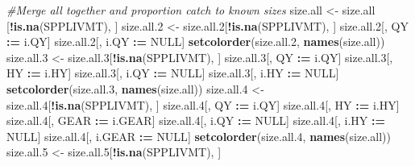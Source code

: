 \documentclass[]{article}
\newenvironment{Shaded}{\begin{snugshade}}{\end{snugshade}}
\newcommand{\KeywordTok}[1]{\textcolor[rgb]{0.13,0.29,0.53}{\textbf{#1}}}
\newcommand{\DecValTok}[1]{\textcolor[rgb]{0.00,0.00,0.81}{#1}}
\newcommand{\StringTok}[1]{\textcolor[rgb]{0.31,0.60,0.02}{#1}}
\newcommand{\CommentTok}[1]{\textcolor[rgb]{0.56,0.35,0.01}{\textit{#1}}}
\newcommand{\OtherTok}[1]{\textcolor[rgb]{0.56,0.35,0.01}{#1}}
\newcommand{\OperatorTok}[1]{\textcolor[rgb]{0.81,0.36,0.00}{\textbf{#1}}}
\newcommand{\ErrorTok}[1]{\textcolor[rgb]{0.64,0.00,0.00}{\textbf{#1}}}
\newcommand{\NormalTok}[1]{#1}
\begin{document}
\begin{Shaded}
\begin{Highlighting}[]
  \CommentTok{#Merge all together and proportion catch to known sizes}
\NormalTok{  size.all   <-}\StringTok{ }\NormalTok{size.all  [}\OperatorTok{!}\KeywordTok{is.na}\NormalTok{(SPPLIVMT), ]}
\NormalTok{  size.all.}\DecValTok{2}\NormalTok{ <-}\StringTok{ }\NormalTok{size.all.}\DecValTok{2}\NormalTok{[}\OperatorTok{!}\KeywordTok{is.na}\NormalTok{(SPPLIVMT), ]}
\NormalTok{  size.all.}\DecValTok{2}\NormalTok{[, QY   }\OperatorTok{:}\ErrorTok{=}\StringTok{ }\NormalTok{i.QY]}
\NormalTok{  size.all.}\DecValTok{2}\NormalTok{[, i.QY }\OperatorTok{:}\ErrorTok{=}\StringTok{ }\OtherTok{NULL}\NormalTok{]}
  \KeywordTok{setcolorder}\NormalTok{(size.all.}\DecValTok{2}\NormalTok{, }\KeywordTok{names}\NormalTok{(size.all))}
\NormalTok{  size.all.}\DecValTok{3}\NormalTok{ <-}\StringTok{ }\NormalTok{size.all.}\DecValTok{3}\NormalTok{[}\OperatorTok{!}\KeywordTok{is.na}\NormalTok{(SPPLIVMT), ]}
\NormalTok{  size.all.}\DecValTok{3}\NormalTok{[, QY   }\OperatorTok{:}\ErrorTok{=}\StringTok{ }\NormalTok{i.QY]}
\NormalTok{  size.all.}\DecValTok{3}\NormalTok{[, HY   }\OperatorTok{:}\ErrorTok{=}\StringTok{ }\NormalTok{i.HY]}
\NormalTok{  size.all.}\DecValTok{3}\NormalTok{[, i.QY }\OperatorTok{:}\ErrorTok{=}\StringTok{ }\OtherTok{NULL}\NormalTok{]}
\NormalTok{  size.all.}\DecValTok{3}\NormalTok{[, i.HY }\OperatorTok{:}\ErrorTok{=}\StringTok{ }\OtherTok{NULL}\NormalTok{]}
  \KeywordTok{setcolorder}\NormalTok{(size.all.}\DecValTok{3}\NormalTok{, }\KeywordTok{names}\NormalTok{(size.all))}
\NormalTok{  size.all.}\DecValTok{4}\NormalTok{ <-}\StringTok{ }\NormalTok{size.all.}\DecValTok{4}\NormalTok{[}\OperatorTok{!}\KeywordTok{is.na}\NormalTok{(SPPLIVMT), ]}
\NormalTok{  size.all.}\DecValTok{4}\NormalTok{[, QY     }\OperatorTok{:}\ErrorTok{=}\StringTok{ }\NormalTok{i.QY]}
\NormalTok{  size.all.}\DecValTok{4}\NormalTok{[, HY     }\OperatorTok{:}\ErrorTok{=}\StringTok{ }\NormalTok{i.HY]}
\NormalTok{  size.all.}\DecValTok{4}\NormalTok{[, GEAR   }\OperatorTok{:}\ErrorTok{=}\StringTok{ }\NormalTok{i.GEAR]}
\NormalTok{  size.all.}\DecValTok{4}\NormalTok{[, i.QY   }\OperatorTok{:}\ErrorTok{=}\StringTok{ }\OtherTok{NULL}\NormalTok{]}
\NormalTok{  size.all.}\DecValTok{4}\NormalTok{[, i.HY   }\OperatorTok{:}\ErrorTok{=}\StringTok{ }\OtherTok{NULL}\NormalTok{]}
\NormalTok{  size.all.}\DecValTok{4}\NormalTok{[, i.GEAR }\OperatorTok{:}\ErrorTok{=}\StringTok{ }\OtherTok{NULL}\NormalTok{]}
  \KeywordTok{setcolorder}\NormalTok{(size.all.}\DecValTok{4}\NormalTok{, }\KeywordTok{names}\NormalTok{(size.all))}
\NormalTok{  size.all.}\DecValTok{5}\NormalTok{ <-}\StringTok{ }\NormalTok{size.all.}\DecValTok{5}\NormalTok{[}\OperatorTok{!}\KeywordTok{is.na}\NormalTok{(SPPLIVMT), ]}

\end{Highlighting}
\end{Shaded}
\end{document}
